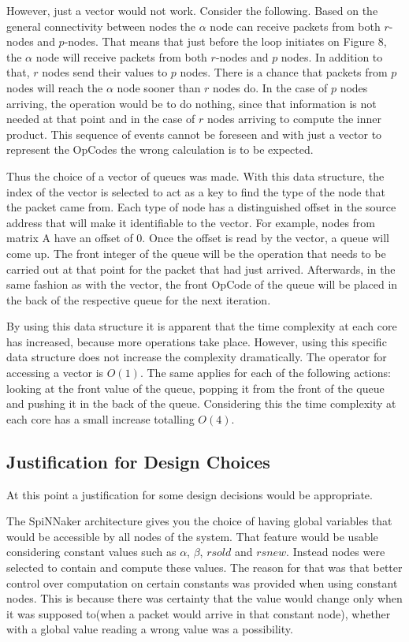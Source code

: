 \documentclass[12pt,a4paper]{article}
\begin{document}
However, just a vector would not work. Consider the following. Based on the general connectivity between nodes the $\alpha$ node can receive packets from both $r$-nodes and $p$-nodes. That means that just before the loop initiates on Figure 8, the $\alpha$ node will receive packets from both $r$-nodes and $p$ nodes. In addition to that, $r$ nodes send their values to $p$ nodes. There is a chance that packets from $p$ nodes will reach the $\alpha$ node sooner than $r$ nodes do. In the case of $p$ nodes arriving, the operation would be to do nothing, since that information is not needed at that point and in the case of $r$ nodes arriving to compute the inner product.  This sequence of events cannot be foreseen and with just a vector to represent the OpCodes the wrong calculation is to be expected.

Thus the choice of a vector of queues was made. With this data structure, the index of the vector is selected to act as a key to find the type of the node that the packet came from. Each type of node has a distinguished offset in the source address that will make it identifiable to the vector. For example, nodes from matrix A have an offset of 0. Once the offset is read by the vector, a queue will come up. The front integer of the queue will be the operation that needs to be carried out at that point for the packet that had just arrived. Afterwards, in the same fashion as with the vector, the front OpCode of the queue will be placed in the back of the respective queue for the next iteration.

By using this data structure it is apparent that the time complexity at each core has increased, because more operations take place. However, using this specific data structure does not increase the complexity dramatically. The operator for accessing a vector is $O(1)$. The same applies for each of the following actions: looking at the front value of the queue, popping it from the front of the queue and pushing it in the back of the queue. Considering this the time complexity at each core has a small increase totalling $O(4)$.
\subsection{Justification for Design Choices}
At this point a justification for some design decisions would be appropriate. 

The SpiNNaker architecture gives you the choice of having global variables that would be accessible by all nodes of the system. That feature would be usable considering constant values such as $\alpha$, $\beta$, $rsold$ and $rsnew$. Instead nodes were selected to contain and compute these values. The reason for that was that better control over computation on certain constants was provided when using constant nodes. This is because there was certainty that the value would change only when it was supposed to(when a packet would arrive in that constant node), whether with a global value reading a wrong value was a possibility.
\end{document}
